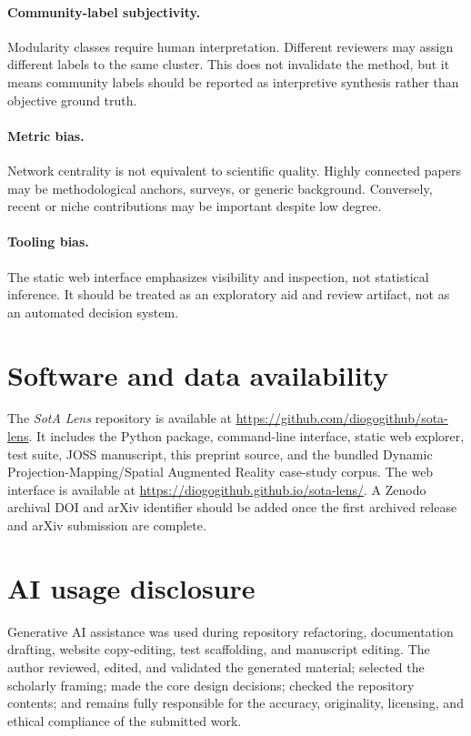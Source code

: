\documentclass[11pt,a4paper]{article}
\newcommand{\tool}{\emph{SotA Lens}}
\newcommand{\dpm}{Dynamic Projection-Mapping}
\newcommand{\sar}{Spatial Augmented Reality}
\begin{document}
\paragraph{Community-label subjectivity.}
Modularity classes require human interpretation. Different reviewers may assign different labels to the same cluster. This does not invalidate the method, but it means community labels should be reported as interpretive synthesis rather than objective ground truth.

\paragraph{Metric bias.}
Network centrality is not equivalent to scientific quality. Highly connected papers may be methodological anchors, surveys, or generic background. Conversely, recent or niche contributions may be important despite low degree.

\paragraph{Tooling bias.}
The static web interface emphasizes visibility and inspection, not statistical inference. It should be treated as an exploratory aid and review artifact, not as an automated decision system.

\section{Software and data availability}

The \tool{} repository is available at \url{https://github.com/diogogithub/sota-lens}. It includes the Python package, command-line interface, static web explorer, test suite, JOSS manuscript, this preprint source, and the bundled \dpm{}/\sar{} case-study corpus. The web interface is available at \url{https://diogogithub.github.io/sota-lens/}. A Zenodo archival DOI and arXiv identifier should be added once the first archived release and arXiv submission are complete.

\section{AI usage disclosure}

Generative AI assistance was used during repository refactoring, documentation drafting, website copy-editing, test scaffolding, and manuscript editing. The author reviewed, edited, and validated the generated material; selected the scholarly framing; made the core design decisions; checked the repository contents; and remains fully responsible for the accuracy, originality, licensing, and ethical compliance of the submitted work.
\end{document}
